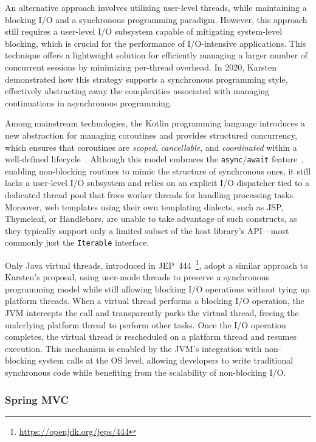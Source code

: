 An alternative approach involves utilizing user-level threads, while
maintaining a blocking I/O and a synchronous programming paradigm. However,
this approach still requires a user-level I/O subsystem capable of mitigating
system-level blocking, which is crucial for the performance of I/O-intensive
applications. This technique offers a lightweight solution for efficiently
managing a larger number of concurrent sessions by minimizing per-thread
overhead. In 2020, Karsten~\cite{karsten2020} demonstrated how this strategy
supports a synchronous programming style, effectively abstracting away the
complexities associated with managing continuations in asynchronous
programming.

Among mainstream technologies, the Kotlin programming language introduces a new
abstraction for managing coroutines and provides structured concurrency, which
ensures that coroutines are \textit{scoped}, \textit{cancellable}, and
\textit{coordinated} within a well-defined
lifecycle~\cite{elizarov2021coroutines}. Although this model embraces the
\texttt{async}/\texttt{await} feature~\cite{async_await}, enabling non-blocking
routines to mimic the structure of synchronous ones, it still lacks a
user-level I/O subsystem and relies on an explicit I/O dispatcher tied to a
dedicated thread pool that frees worker threads for handling processing tasks.
Moreover, web templates using their own templating dialects, such as JSP,
Thymeleaf, or Handlebars, are unable to take advantage of such constructs, as
they typically support only a limited subset of the host library's API—most
commonly just the \texttt{Iterable} interface.

Only Java virtual threads, introduced in
JEP~444~\footnote{\url{https://openjdk.org/jeps/444}}, adopt a similar approach
to Karsten's proposal, using user-mode threads to preserve a synchronous
programming model while still allowing blocking I/O operations without tying up
platform threads. When a virtual thread performs a blocking I/O operation, the
JVM intercepts the call and transparently parks the virtual thread, freeing the
underlying platform thread to perform other tasks. Once the I/O operation
completes, the virtual thread is rescheduled on a platform thread and resumes
execution. This mechanism is enabled by the JVM's integration with non-blocking
system calls at the OS level, allowing developers to write traditional
synchronous code while benefiting from the scalability of non-blocking I/O.

\subsubsection{Spring MVC}

